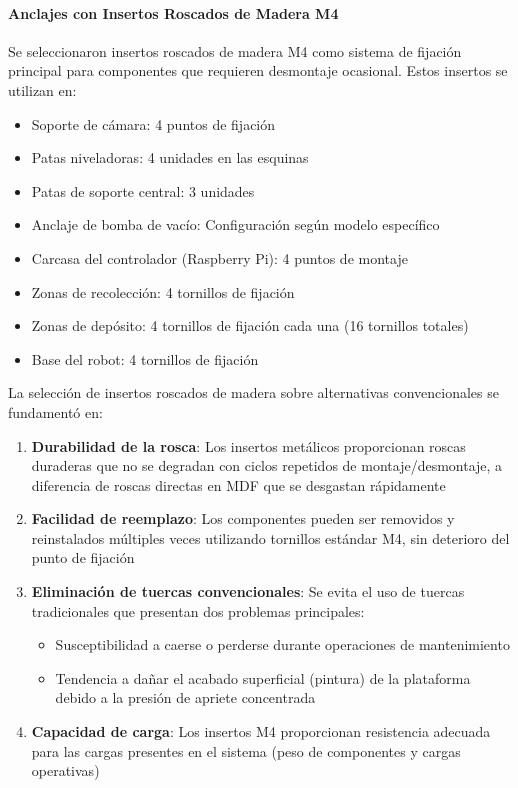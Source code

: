 \paragraph{Anclajes con Insertos Roscados de Madera M4}

Se seleccionaron insertos roscados de madera M4 como sistema de fijación principal para componentes que requieren desmontaje ocasional. Estos insertos se utilizan en:

\begin{itemize}
    \item Soporte de cámara: 4 puntos de fijación
    \item Patas niveladoras: 4 unidades en las esquinas
    \item Patas de soporte central: 3 unidades
    \item Anclaje de bomba de vacío: Configuración según modelo específico
    \item Carcasa del controlador (Raspberry Pi): 4 puntos de montaje
    \item Zonas de recolección: 4 tornillos de fijación
    \item Zonas de depósito: 4 tornillos de fijación cada una (16 tornillos totales)
    \item Base del robot: 4 tornillos de fijación
\end{itemize}

La selección de insertos roscados de madera sobre alternativas convencionales se fundamentó en:

\begin{enumerate}
    \item \textbf{Durabilidad de la rosca}: Los insertos metálicos proporcionan roscas duraderas que no se degradan con ciclos repetidos de montaje/desmontaje, a diferencia de roscas directas en MDF que se desgastan rápidamente
    
    \item \textbf{Facilidad de reemplazo}: Los componentes pueden ser removidos y reinstalados múltiples veces utilizando tornillos estándar M4, sin deterioro del punto de fijación
    
    \item \textbf{Eliminación de tuercas convencionales}: Se evita el uso de tuercas tradicionales que presentan dos problemas principales:
    \begin{itemize}
        \item Susceptibilidad a caerse o perderse durante operaciones de mantenimiento
        \item Tendencia a dañar el acabado superficial (pintura) de la plataforma debido a la presión de apriete concentrada
    \end{itemize}
    
    \item \textbf{Capacidad de carga}: Los insertos M4 proporcionan resistencia adecuada para las cargas presentes en el sistema (peso de componentes y cargas operativas)
\end{enumerate}

